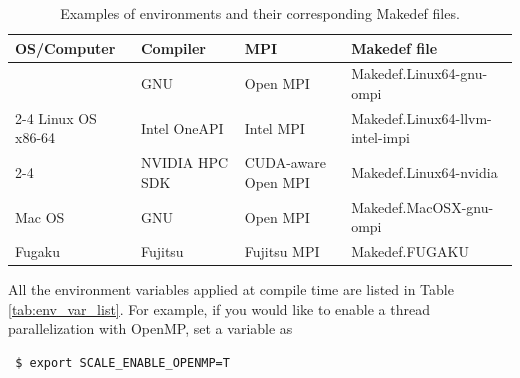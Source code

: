 \begin{table}[htb]
\begin{center}
\caption{Examples of environments and their corresponding Makedef files.}
\begin{tabularx}{150mm}{|l|l|X|l|} \hline
 \rowcolor[gray]{0.9} OS/Computer & Compiler & MPI & Makedef file \\ \hline
                 & GNU            & Open MPI & Makedef.Linux64-gnu-ompi \\ \cline{2-4}
 Linux OS x86-64 & Intel OneAPI   & Intel MPI & Makedef.Linux64-llvm-intel-impi \\ \cline{2-4}
                 & NVIDIA HPC SDK & CUDA-aware Open MPI & Makedef.Linux64-nvidia \\ \hline
 Mac OS          & GNU            & Open MPI  & Makedef.MacOSX-gnu-ompi \\ \hline
 Fugaku          & Fujitsu        & Fujitsu MPI & Makedef.FUGAKU \\ \hline
\end{tabularx}
\label{tab:makedef}
\end{center}
\end{table}


All the environment variables applied at compile time are listed in Table \ref{tab:env_var_list}.
For example, if you would like to enable a thread parallelization with OpenMP, 
set a variable as
\begin{verbatim}
 $ export SCALE_ENABLE_OPENMP=T
\end{verbatim}

